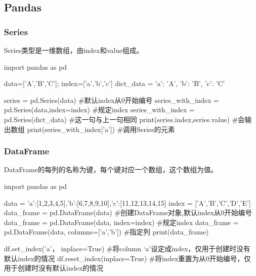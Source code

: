   \subsection{Pandas}
    \subsubsection{Series}
      Series类型是一维数组，由index和value组成。
      \begin{codeblock}[language=python, caption={Series in Pandas}]
        import pandas as pd

        data=['A','B','C']; index=['a','b','c']
        dict_data = {'a': 'A', 'b': 'B', 'c': 'C'} 
        
        series = pd.Series(data) #默认index从0开始编号
        series_with_index = pd.Series(data,index=index) #规定index
        series_with_index = pd.Series(dict_data) #这一句与上一句相同
        print(series.index,series.value) #会输出数组
        print(series_with_index['a']) #调用Series的元素
      \end{codeblock}

    \subsubsection{DataFrame}
      DataFrame的每列的名称为键，每个键对应一个数组，这个数组为值。
      \begin{codeblock}[language=python, caption={Create a dataframe}]
        import pandas as pd

        data = {'a':[1,2,3,4,5],'b':[6,7,8,9,10],'c':[11,12,13,14,15]}
        index = ['A','B','C','D','E']
        data_frame = pd.DataFrame(data) #创建DataFrame对象,默认index从0开始编号
        data_frame = pd.DataFrame(data, index=index) #规定index
        data_frame = pd.DataFrame(data, columns=['a','b']) #指定列
        print(data_frame)

        df.set_index('a'， inplace=True) #将column `a'设定成index，仅用于创建时没有默认index的情况
        df.reset_index(inplace=True) #将index重置为从0开始编号，仅用于创建时没有默认index的情况
      \end{codeblock}

